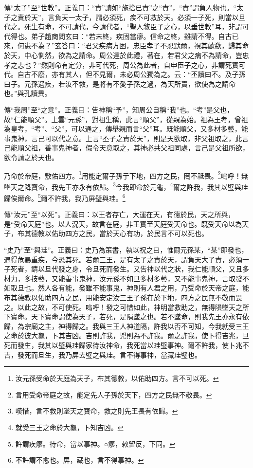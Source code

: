 {\noindent\zhuan{}\fzbyks 傳“太子”至“世教”。正義曰：“責”讀如“施捨已責”之“責”，“責”謂負人物也。“太子之責於天”，言負天一太子，謂必須死，疾不可救於天。必須一子死，則當以旦代之。死生有命，不可請代，今請代者，“聖人敘臣子之心，以垂世教”耳，非謂可代得也。弟子趙商問玄曰：“若未終，疾固當瘳。信命之終，雖請不得。自古已來，何患不為？”玄答曰：“君父疾病方困，忠臣孝子不忍默爾，視其歔欷，歸其命於天，中心惻然，欲為之請命。周公達於此禮，著在，若君父之病不為請命，豈忠孝之志也？”然則命有定分，非可代死，周公為此者，自申臣子之心，非謂死實可代。自古不廢，亦有其人，但不見爾，未必周公獨為之。云：“丕讀曰不。及子孫曰子。元孫遇疾，若汝不救，是將有不愛子孫之過，為天所責，欲使為之請命也。”與孔讀異。 \par}

{\noindent\zhuan{}\fzbyks 傳“我周”至“之意”。正義曰：告神稱“予”，知周公自稱“我”也。“考”是父也，故“仁能順父”。上雲“元孫”，對祖生稱，此言“順父”，從親為始。祖為王考，曾祖為皇考，“考”、“父”，可以通之，傳舉親而言“父”耳。既能順父，又多材多藝，能事鬼神，言己可以代之意。上言“丕子之責於天”，則是天欲取，非父祖取之，此言己能順父祖，善事鬼神者，假令天意取之，其神必共父祖同處，言己是父祖所欲，欲令請之於天也。 \par}

乃命於帝庭，敷佑四方。\footnote{汝元孫受命於天庭為天子，布其德教，以佑助四方。言不可以死。}用能定爾子孫亍下地，四方之民，罔不祗畏。\footnote{言用受命帝庭之故，能定先人子孫於天下，四方之民無不敬畏。}嗚呼！無墜天之降寶命，我先王亦永有依歸。\footnote{嘆惜，言不救則墜天之寶命，救之則先王長有依歸。}今我即命於元龜，\footnote{就受三王之命於大龜，卜知吉凶。}爾之許我，我其以璧與珪歸俟爾命。\footnote{許謂疾瘳。待命，當以事神。○瘳，敕留反，下同。}爾不許我，我乃屏璧與珪。\footnote{不許謂不愈也。屏，藏也，言不得事神。}

{\noindent\zhuan{}\fzbyks 傳“汝元”至“以死”。正義曰：以王者存亡，大運在天，有德於民，天之所與，是“受命天庭”也。以人況天，故言在庭，非王實至天庭受天命也。既受天命以為天子，布其德教以佑助四方之民，當於天心有功，於民言不可以死也。 \par}

{\noindent\shu{}\fzkt “史乃”至“與珪”。正義曰：史乃為策書，執以祝之曰，惟爾元孫某，“某”即發也，遇得危暴重疾，今恐其死。若爾三王，是有太子之責於天，謂負天大子責，必須一子死者，請以旦代發之身，令旦死而發生。又告神以代之狀，我仁能順父，又且多材力，多技藝，又能善事鬼神，汝元孫不如旦多材多藝，又不能事鬼神，言取發不如取旦也。然人各有能，發雖不能事鬼，神則有人君之用，乃受命於天帝之庭，能布其德教以佑助四方之民，用能安定汝三王子孫在於下地，四方之民無不敬而畏之。以此之故，不可使死。嗚呼！發之可惜如此，神明當救助之，無得隕墜天之所下寶命。天下寶命謂使為天子，若死，是隕墜之也。若不墜命，則我先王亦永有依歸，為宗廟之主，神得歸之。我與三王人神道隔，許我以否不可知，今我就受三王之命於彼大龜，卜其吉凶。吉則許我，兇則為不許我。爾之許我，使卜得吉兆，旦死而發生，我其以璧與珪歸家待汝神命，我死當以珪璧事神。爾不許我，使卜兆不吉，發死而旦生，我乃屏去璧之與珪。言不得事神，當藏珪璧也。 \par}

